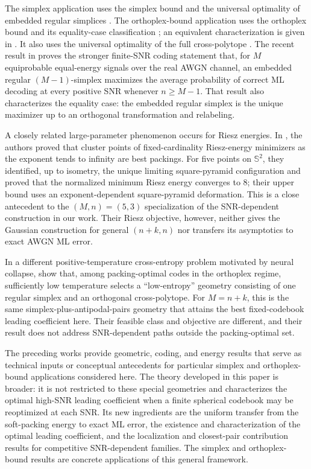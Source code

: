 \documentclass[12pt,draftclsnofoot,onecolumn]{IEEEtran}
\newcommand{\Sph}{\mathbb{S}}
\theoremstyle{definition}
\begin{document}
The simplex application uses the simplex bound \cite{Rankin1955} and
the universal optimality of embedded regular simplices
\cite{CohnKumar2007}.  The orthoplex-bound application uses the orthoplex
bound \cite{Rankin1955} and its equality-case classification
\cite[Thm.~3]{Kuperberg2007}; an equivalent characterization is given in
\cite[Thm.~2.2]{KingMixonParshallWells2026}.  It also uses the universal
optimality of the full cross-polytope \cite{CohnKumar2007}.  The recent result in
\cite[Cors.~2.5--2.6]{Mulgund2026WeakSimplex} proves the stronger finite-SNR
coding statement that, for \(M\) equiprobable equal-energy signals over
the real AWGN channel, an embedded regular \((M-1)\)-simplex maximizes
the average probability of correct ML decoding at every positive SNR
whenever \(n\geq M-1\).
That result also characterizes the equality case: the embedded regular
simplex is the unique maximizer up to an orthogonal transformation and
relabeling.

A closely related large-parameter phenomenon occurs for Riesz energies.
In \cite{BondarenkoHardinSaff2014}, the authors proved that
cluster points of fixed-cardinality
Riesz-energy minimizers as the exponent tends to infinity are best
packings.  For five points on \(\Sph^2\), they identified, up to isometry,
the unique limiting square-pyramid configuration and proved that the
normalized minimum Riesz energy converges to \(8\); their upper bound
uses an exponent-dependent square-pyramid deformation.
This is a close antecedent to the \((M,n)=(5,3)\) specialization of
the SNR-dependent construction in our work.
Their Riesz objective, however, neither gives the Gaussian construction
for general \((n+k,n)\) nor transfers its asymptotics to exact AWGN ML error.

In a different positive-temperature cross-entropy problem motivated by
neural collapse, \cite{AlcalaEtAl2026NeuralCollapse} show
that, among packing-optimal
codes in the orthoplex regime, sufficiently low temperature selects a
``low-entropy'' geometry consisting of one regular simplex and an
orthogonal cross-polytope.
For \(M=n+k\), this is the same simplex-plus-antipodal-pairs geometry that
attains the best fixed-codebook leading coefficient here.  Their feasible class
and objective are different, and their result does not address
SNR-dependent paths outside the packing-optimal set.

The preceding works provide geometric, coding, and energy results that
serve as technical inputs or conceptual antecedents for particular
simplex and orthoplex-bound applications considered here.  The theory
developed in this paper is broader: it is not restricted to these
special geometries and characterizes the optimal high-SNR leading coefficient
when a finite spherical codebook may be reoptimized at each SNR.  Its
new ingredients are the uniform transfer from the soft-packing energy
to exact ML error, the existence and characterization of the optimal
leading coefficient, and the localization and closest-pair contribution
results for competitive SNR-dependent families.  The simplex and
orthoplex-bound results are concrete applications of this general framework.
\end{document}
